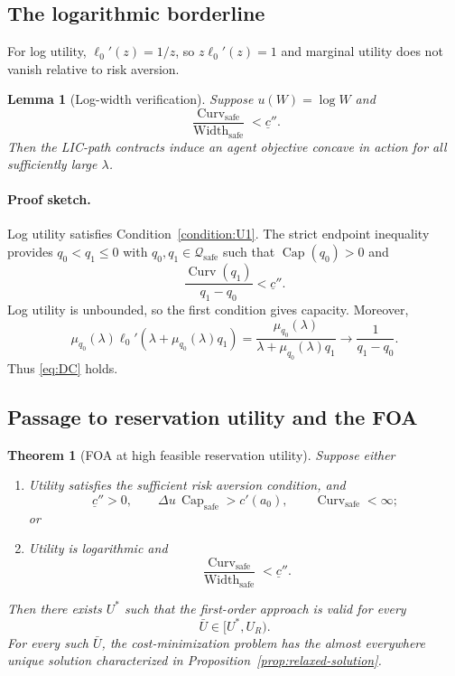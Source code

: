 \documentclass[11pt]{article}
\newtheorem{theorem}{Theorem}
\newtheorem{lemma}{Lemma}
\theoremstyle{remark}
\newcommand{\cQ}{\mathcal Q}
\DeclareMathOperator{\Capacity}{Cap}
\DeclareMathOperator{\Curv}{Curv}
\DeclareMathOperator{\Width}{Width}
\newcommand{\proofsketch}{\paragraph{Proof sketch.}}
\begin{document}
\subsection{The logarithmic borderline}

For log utility, $\ell_0'(z)=1/z$, so $z\ell_0'(z)=1$ and marginal utility does
not vanish relative to risk aversion.

\begin{lemma}[Log-width verification]
\label{lem:log-width}
Suppose $u(W)=\log W$ and
\begin{equation}
 \frac{\Curv_{\mathrm{safe}}}{\Width_{\mathrm{safe}}}
 <\underline c''.
 \tag{LogWidth}\label{eq:log-width}
\end{equation}
Then the LIC-path contracts induce an agent objective concave in action for all
sufficiently large $\lambda$.
\end{lemma}

\proofsketch
Log utility satisfies Condition~\eqref{condition:U1}.  The strict endpoint
inequality provides $q_0<q_1\le0$ with
$q_0,q_1\in\cQ_{\mathrm{safe}}$ such that $\Capacity(q_0)>0$ and
\[
 \frac{\Curv(q_1)}{q_1-q_0}<\underline c''.
\]
Log utility is unbounded, so the first condition gives capacity.  Moreover,
\[
 \mu_{q_0}(\lambda)
 \ell_0'(\lambda+\mu_{q_0}(\lambda)q_1)
 =\frac{\mu_{q_0}(\lambda)}
 {\lambda+\mu_{q_0}(\lambda)q_1}
 \longrightarrow\frac1{q_1-q_0}.
\]
Thus \eqref{eq:DC} holds.

\subsection{Passage to reservation utility and the FOA}

\begin{theorem}[FOA at high feasible reservation utility]
\label{thm:high-reservation}
Suppose either
\begin{enumerate}[label=(\roman*)]
 \item Utility satisfies the sufficient risk aversion condition, and
 \[
  \underline c''>0,
  \qquad
  \Delta u\,\Capacity_{\mathrm{safe}}>c'(a_0),
  \qquad
  \Curv_{\mathrm{safe}}<\infty;
 \]
 or
 \item Utility is logarithmic and
 \[
  \frac{\Curv_{\mathrm{safe}}}{\Width_{\mathrm{safe}}}
  <\underline c''.
 \]
\end{enumerate}
Then there exists $U^*$ such that the first-order approach is valid for every
\[
 \bar U\in[U^*,U_R).
\]
For every such $\bar U$, the cost-minimization problem has the almost
everywhere unique solution characterized in Proposition~\ref{prop:relaxed-solution}.
\end{theorem}
\end{document}
